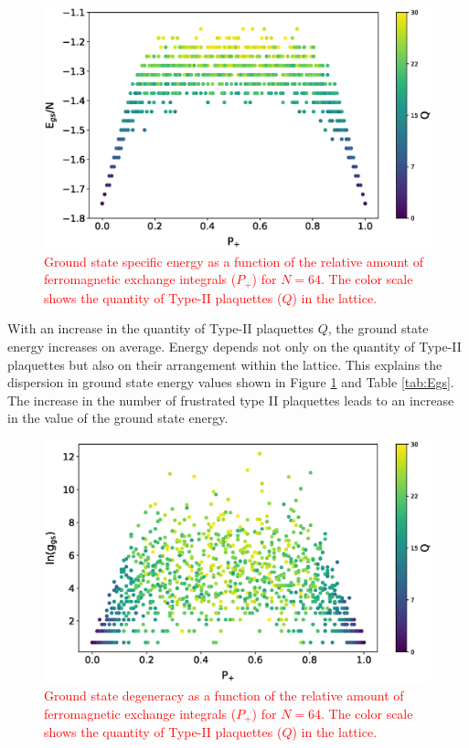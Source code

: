 \documentclass[preprint,12pt]{elsarticle}
\begin{document}
	\begin{figure}[H]
		\centering
		\includegraphics[width=1.0\linewidth]{pictures/E_P_Q.eps}
		\caption{\textcolor{red}{Ground state specific energy as a function of the relative amount of ferromagnetic exchange integrals ($P_+$) for $N=64$. The color scale shows the quantity of Type-II plaquettes ($Q$) in the lattice.}}
		\label{fig:E(Q)}
	\end{figure}
	
	With an increase in the quantity of Type-II plaquettes $Q$, the ground state energy increases on average. Energy depends not only on the quantity of Type-II plaquettes but also on their arrangement within the lattice. This explains the dispersion in ground state energy values shown in Figure \ref{fig:E(Q)} and Table \ref{tab:Egs}. The increase in the number of frustrated type II plaquettes leads to an increase in the value of the ground state energy.
	
	
	\begin{figure}[H]
		\centering
		\includegraphics[width=1.0\linewidth]{pictures/lng_P_Q.eps}
		\caption{\textcolor{red}{Ground state degeneracy as a function of the relative amount of ferromagnetic exchange integrals ($P_+$) for $N=64$. The color scale shows the quantity of Type-II plaquettes ($Q$) in the lattice.}}
		\label{fig:g(Q)}
	\end{figure}
	
\end{document}
